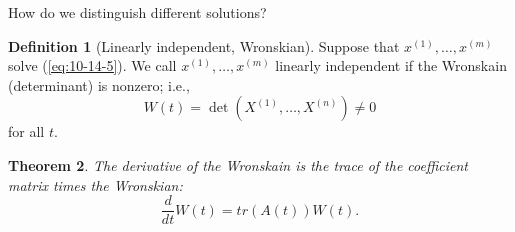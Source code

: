 \documentclass{tufte-handout}
\newtheorem{thm}{Theorem}[subsection]
\theoremstyle{definition}
\newtheorem{defn}[thm]{Definition}
\begin{document}
How do we distinguish different solutions?

\begin{defn}[Linearly independent, Wronskian]
	Suppose that $x^{(1)},\ldots,x^{(m)}$ solve (\ref{eq:10-14-5}). We call $x^{(1)},\ldots,x^{(m)}$ linearly independent if the Wronskain (determinant) is nonzero; i.e., \[
		W(t) = \det \left( X^{(1)},\ldots,X^{(n)} \right) \ne 0
	\] for all $t$.
\end{defn}

\begin{thm}
	The derivative of the Wronskain is the trace of the coefficient matrix times the Wronskian: \[
		\frac{d}{dt}W(t) = tr (A(t)) W(t)
	.\] 
\end{thm}
\end{document}
